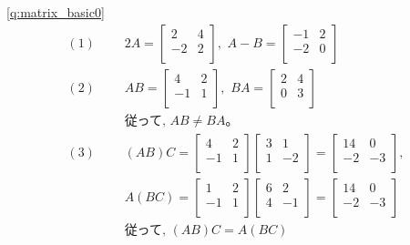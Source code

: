\ref{q:matrix_basic0}  
\begin{eqnarray*}
(1)\,\,\,\,&&2A=
\begin{bmatrix}
2 & 4 \\
-2 & 2 \\
\end{bmatrix}
,\,\,
A-B=
\begin{bmatrix}
-1 & 2 \\
-2 & 0 \\
\end{bmatrix}\\
(2)\,\,\,\,&&AB=
\begin{bmatrix}
4 & 2 \\
-1 & 1 \\
\end{bmatrix}
,\,\,
BA=
\begin{bmatrix}
2 & 4 \\
0 & 3 \\
\end{bmatrix}\\
&&\text{従って, $AB\ne BA$。}\\
(3)\,\,\,\,&&(AB)C=
\begin{bmatrix}
4 & 2 \\
-1 & 1 \\
\end{bmatrix}
\begin{bmatrix}
3 & 1 \\
1 & -2 \\
\end{bmatrix}
=
\begin{bmatrix}
14 & 0 \\
-2 & -3 \\
\end{bmatrix}
, \\
&&A(BC)=
\begin{bmatrix}
1 & 2 \\
-1 & 1 \\
\end{bmatrix}
\begin{bmatrix}
6 & 2 \\
4 & -1 \\
\end{bmatrix}
=\begin{bmatrix}
14 & 0 \\
-2 & -3 \\
\end{bmatrix}\\
&&\text{従って, }(AB)C=A(BC)\\

\end{eqnarray*}
